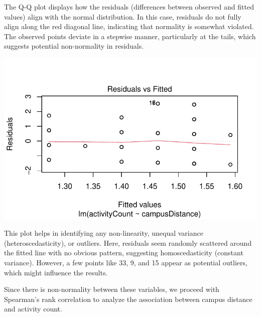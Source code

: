 \documentclass[
  letterpaper,
  DIV=11,
  numbers=noendperiod]{scrartcl}
\begin{document}
The Q-Q plot displays how the residuals (differences between observed
and fitted values) align with the normal distribution. In this case,
residuals do not fully align along the red diagonal line, indicating
that normality is somewhat violated. The observed points deviate in a
stepwise manner, particularly at the tails, which suggests potential
non-normality in residuals.

\includegraphics{technical_report_files/figure-pdf/plot3-1.pdf}

This plot helps in identifying any non-linearity, unequal variance
(heteroscedasticity), or outliers. Here, residuals seem randomly
scattered around the fitted line with no obvious pattern, suggesting
homoscedasticity (constant variance). However, a few points like 33, 9,
and 15 appear as potential outliers, which might influence the results.

Since there is non-normality between these variables, we proceed with
Spearman's rank correlation to analyze the association between campus
distance and activity count.
\end{document}
